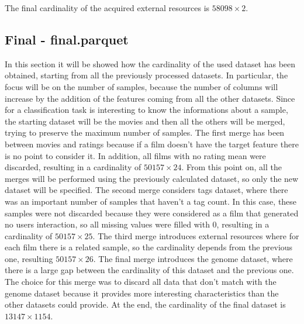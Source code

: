 \documentclass[../main]{subfiles}
\begin{document}
The final cardinality of the acquired external resources is $58098 \times 2$.

\subsection*{Final - final.parquet}
In this section it will be showed how the cardinality of the used dataset has been obtained, starting from all the previously processed datasets.
In particular, the focus will be on the number of samples, because the number of columns will increase by the addition of the features coming from all the other datasets.
Since for a classification task is interesting to know the informations about a sample, the starting dataset will be the movies and then all the others will be merged, trying to preserve the maximum number of samples.
The first merge has been between movies and ratings because if a film doesn’t have the target feature there is no point to consider it.
In addition, all films with no rating mean were discarded, resulting in a cardinality of $50157 \times 24$.
From this point on, all the merges will be performed using the previously calculated dataset, so only the new dataset will be specified.
The second merge considers tags dataset, where there was an important number of samples that haven't a tag count.
In this case, these samples were not discarded because they were considered as a film that generated no users interaction, so all missing values were filled with 0, resulting in a cardinality of $50157 \times 25$.
The third merge introduces external resources where for each film there is a related sample, so the cardinality depends from the previous one, resulting $50157 \times 26$.
The final merge introduces the genome dataset, where there is a large gap between the cardinality of this dataset and the previous one.
The choice for this merge was to discard all data that don't match with the genome dataset because it provides more interesting characteristics than the other datasets could provide.
At the end, the cardinality of the final dataset is $13147 \times 1154$.
\end{document}
